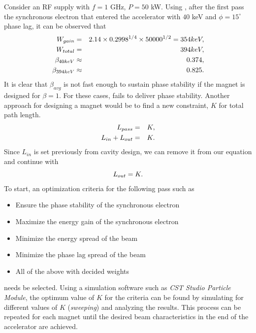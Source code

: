 \documentclass{article}
\begin{document}
Consider an RF supply with $f=1$ GHz, $P=50$ kW. Using , 
after the first pass the synchronous electron that entered the accelerator with $40$ keV and $\phi=15^\circ$ phase lag,
it can be observed that
\vspace{-10pt}\begin{eqnarray}
    W_{gain} &=& 2.14\times0.2998^{1/4}\times 50000^{1/2} = 354keV   ,\\
    W_{total} &=& 394 keV   ,\\
    \beta_{40keV} &\approx& 0.374   ,\\
    \beta_{394keV} &\approx& 0.825 .
\vspace{-20pt}\end{eqnarray}
It is clear that $\beta_{avg}$ is not fast enough to sustain phase stability if the magnet is designed for $\beta = 1$. 
For these cases,  fails to deliver phase stability.
Another approach for designing a magnet would be to find a new constraint, $K$ for total path length.
\vspace{-10pt}\begin{eqnarray}
    L_{pass} &=& K ,\\
    L_{in} + L_{out} &=& K .
\vspace{-20pt}\end{eqnarray}
Since $L_{in}$ is set previously from cavity design, we can remove it from our equation and continue with
\vspace{-10pt}\begin{equation} \label{eq:mag_sweep_constraint}
    L_{out} = K .
\vspace{-10pt}\end{equation}
\clearpage
To start, an optimization criteria for the following pass such as
\vspace{-10pt}
\begin{itemize}
    \item Ensure the phase stability of the synchronous electron
    \item Maximize the energy gain of the synchronous electron
    \item Minimize the energy spread of the beam
    \item Minimize the phase lag spread of the beam
    \item All of the above with decided weights
\vspace{-10pt}\end{itemize}
needs be selected. Using a simulation software such as \textit{CST Studio Particle Module}, the optimum value of $K$ for the criteria can be found by simulating for different values of $K$ (\textit{sweeping}) and analyzing the results.
This process can be repeated for each magnet until the desired beam characteristics in the end of the accelerator are achieved.
\end{document}
